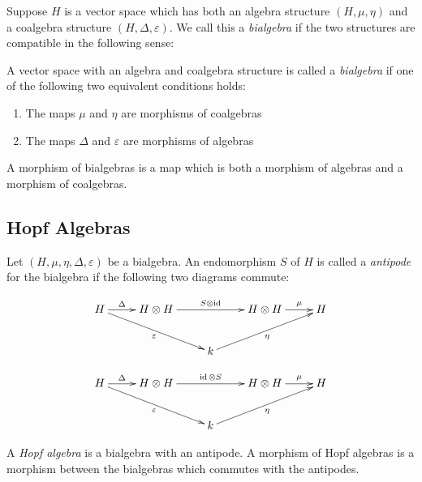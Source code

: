 Suppose $H$ is a vector space which has both an algebra structure $(H, \mu,
\eta)$ and a coalgebra structure $(H, \Delta, \varepsilon)$. We call this a
\emph{bialgebra} if the two structures are compatible in the following sense:

\begin{defn}
    A vector space with an algebra and coalgebra structure is called a
    \emph{bialgebra} if one of the following two equivalent conditions holds:

    \begin{enumerate}
        \item The maps $\mu$ and $\eta$ are morphisms of coalgebras
        \item The maps $\Delta$ and $\varepsilon$ are morphisms of algebras
    \end{enumerate}
\end{defn}

A morphism of bialgebras is a map which is both a morphism of algebras and a
morphism of coalgebras.
\subsection{Hopf Algebras}


\begin{defn}
    Let $(H, \mu, \eta, \Delta, \varepsilon)$ be a bialgebra. An endomorphism
    $S$ of $H$ is called a \emph{antipode} for the bialgebra if the following
    two diagrams commute:

    \begin{equation}
        \xymatrix{
        H \ar[r]^-{\Delta} \ar[rrd]_-{\varepsilon}& H \otimes H \ar[rr]^-{S \otimes \id} & & H \otimes H \ar[r]^-{\mu} & H \\
        & & k \ar[rru]_-{\eta}& &
        }
    \end{equation}

    \begin{equation}
        \xymatrix{
        H \ar[r]^-{\Delta} \ar[rrd]_-{\varepsilon}& H \otimes H \ar[rr]^-{\id \otimes S} & & H \otimes H \ar[r]^-{\mu} & H \\
        & & k \ar[rru]_-{\eta}& &
        }
    \end{equation}
\end{defn}

\begin{defn}
    A \emph{Hopf algebra} is a bialgebra with an antipode. A morphism of Hopf
    algebras is a morphism between the bialgebras which commutes with the
    antipodes. 
\end{defn}

